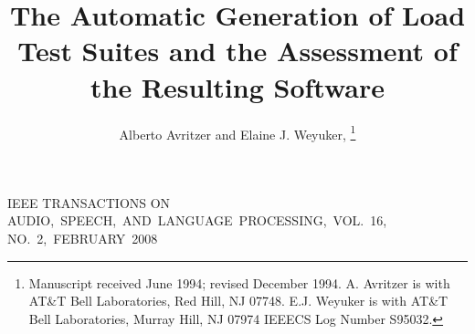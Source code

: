 \documentclass[journal, twoside]{IEEEtran}
\begin{document}
%
\title{The Automatic Generation of Load Test Suites and
the Assessment of the Resulting Software}
%
%
%

\author{Alberto Avritzer and Elaine J. Weyuker,%
\thanks{Manuscript received June 1994; revised December 1994.
A. Avritzer is with AT&T Bell Laboratories, Red Hill, NJ 07748.
E.J. Weyuker is with AT&T Bell Laboratories, Murray Hill, NJ 07974
IEEECS Log Number S95032.}%
}


% 
%



{IEEE TRANSACTIONS ON AUDIO,~SPEECH,~AND~LANGUAGE~PROCESSING,~VOL.~16, NO.~2,~FEBRUARY~2008}
% 
\end{document}
